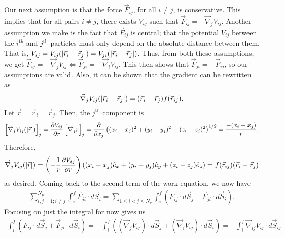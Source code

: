 Our next assumption is that the force $\vec{F}_{ij}$, for all $i \neq j$, is conservative. This implies that for all pairs $i \neq j$, there exists $V_{ij}$ such that $\vec{F}_{ij} = -\vec{\nabla}_{j}V_{ij}$. Another assumption we make is the fact that $\vec{F}_{ij}$ is central; that the potential $V_{ij}$ between the $i^{\text{th}}$ and $j^{\text{th}}$ particles must only depend on the absolute distance between them. That is, $V_{ij} = V_{ij}(\left| \vec{r}_{i}-\vec{r}_{j} \right|) = V_{ji}(\left| \vec{r}_{i}-\vec{r}_{j} \right|)$. Thus, from both these assumptions, we get $\vec{F}_{ij} = -\vec{\nabla}_{j}V_{ij} \Leftrightarrow \vec{F}_{ji} = -\vec{\nabla}_{i}V_{ij}$. This then shows that $\vec{F}_{ji} = -\vec{F}_{ij}$, so our assumptions are valid. Also, it can be shown that the gradient can be rewritten as
\begin{align}
    \vec{\nabla}_{j} V_{ij}(\left| \vec{r}_{i}-\vec{r}_{j} \right|) = (\vec{r}_{i}-\vec{r}_{j})f(\vec{r}_{ij}).
\end{align}
Let $\vec{r} = \vec{r}_{i} = \vec{r}_{j}$. Then, the $j^{\text{th}}$ component is
\begin{align}
    \left[\vec{\nabla}_{j} V_{ij}(\left| \vec{r} \right|)\right]_{j} = \frac{\partial V_{ij}}{\partial r} \left[ \vec{\nabla}_{j} r \right]_{j} = \frac{\partial}{\partial x_{j}} \left( (x_{i}-x_{j})^{2} + (y_{i}-y_{j})^{2} + (z_{i}-z_{j})^{2} \right)^{1/2} = \frac{-(x_{i}-x_{j})}{r}.
\end{align}
Therefore,
\begin{align}
    \vec{\nabla}_{j} V_{ij}(\left| \vec{r} \right|) = \left( -\frac{1}{r}\frac{\partial V_{ij}}{\partial r} \right) \left( (x_{i}-x_{j})\hat{e}_{x} + (y_{i}-y_{j})\hat{e}_{y} + (z_{i}-z_{j})\hat{e}_{z} \right) = f(\vec{r}_{ij}) (\vec{r}_{i}-\vec{r}_{j})
\end{align}
as desired. Coming back to the second term of the work equation, we now have
\begin{align}
    \sum_{i,j=1;i \neq j}^{N_{p}} \int_{i}^{f} \vec{F}_{ji} \cdot d\vec{S}_{i} = \sum_{1 \leq i < j \leq N_{p}} \int_{i}^{f} \left( F_{ij} \cdot d\vec{S}_{j} + \vec{F}_{ji} \cdot d\vec{S}_{i} \right).
\end{align}
Focusing on just the integral for now gives us
\begin{align}
    \int_{i}^{f} \left( F_{ij} \cdot d\vec{S}_{j} + \vec{F}_{ji} \cdot d\vec{S}_{i} \right) = -\int_{i}^{f} \left( (\vec{\nabla}_{j}V_{ij}) \cdot d\vec{S}_{j} + (\vec{\nabla}_{i} V_{ij}) \cdot d\vec{S}_{i} \right) = -\int_{i}^{f} \vec{\nabla}_{ij} V_{ij} \cdot d\vec{S}_{ij}
\end{align}
